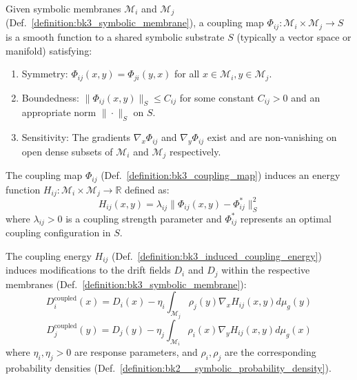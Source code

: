 \begin{definition} \label{definition:bk3_coupling_map}
Given symbolic membranes $\mathcal{M}_i$ and $\mathcal{M}_j$ (Def.~\ref{definition:bk3_symbolic_membrane}), a coupling map $\Phi_{ij}: \mathcal{M}_i \times \mathcal{M}_j \rightarrow S$ is a smooth function to a shared symbolic substrate $S$ (typically a vector space or manifold) satisfying:
\begin{enumerate}
    \item Symmetry: $\Phi_{ij}(x,y) = \Phi_{ji}(y,x)$ for all $x \in \mathcal{M}_i, y \in \mathcal{M}_j$.
    \item Boundedness: $\|\Phi_{ij}(x,y)\|_S \leq C_{ij}$ for some constant $C_{ij} > 0$ and an appropriate norm $\|\cdot\|_S$ on $S$.
    \item Sensitivity: The gradients $\nabla_x\Phi_{ij}$ and $\nabla_y\Phi_{ij}$ exist and are non-vanishing on open dense subsets of $\mathcal{M}_i$ and $\mathcal{M}_j$ respectively.
\end{enumerate}
\end{definition}

\begin{definition} \label{definition:bk3_induced_coupling_energy}
The coupling map $\Phi_{ij}$ (Def.~\ref{definition:bk3_coupling_map}) induces an energy function $H_{ij}: \mathcal{M}_i \times \mathcal{M}_j \rightarrow \mathbb{R}$ defined as:
\[
H_{ij}(x,y) = \lambda_{ij} \|\Phi_{ij}(x,y) - \Phi_{ij}^*\|_S^2
\]
where $\lambda_{ij} > 0$ is a coupling strength parameter and $\Phi_{ij}^*$ represents an optimal coupling configuration in $S$.
\end{definition}

\begin{theorem} \label{theorem:bk3_couplinginduced_drift_modification}
\leavevmode\newline
The coupling energy $H_{ij}$ (Def.~\ref{definition:bk3_induced_coupling_energy}) induces modifications to the drift fields $D_i$ and $D_j$ within the respective membranes (Def.~\ref{definition:bk3_symbolic_membrane}):
\[
D_i^{\text{coupled}}(x) = D_i(x) - \eta_i \int_{\mathcal{M}_j} \rho_j(y)\nabla_x H_{ij}(x,y)d\mu_g(y)
\]
\[
D_j^{\text{coupled}}(y) = D_j(y) - \eta_j \int_{\mathcal{M}_i} \rho_i(x)\nabla_y H_{ij}(x,y)d\mu_g(x)
\]
where $\eta_i, \eta_j > 0$ are response parameters, and $\rho_i, \rho_j$ are
the corresponding probability densities
(Def.~\ref{definition:bk2__symbolic_probability_density}).
\end{theorem}

